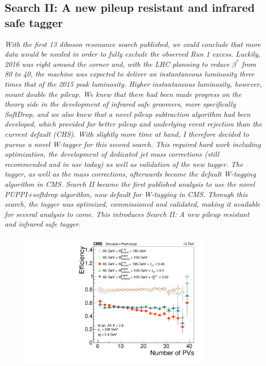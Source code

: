 \vspace*{\fill}
\begin{centering}
\section{Search II: A new pileup resistant and infrared safe tagger}
\label{searchII}
\textit{
With the first 13 \TeV diboson resonance search published, we could conclude that more data would be needed in order to fully exclude the observed Run 1 excess. Luckily, 2016 was right around the corner and, with the LHC planning to reduce $\beta^*$ from 80 \cm to 40, the machine was expected to deliver an instantaneous luminosity three times that of the 2015 peak luminosity. Higher instantaneous luminosity, however, meant double the pileup.
\newline
\newline
We knew that there had been made progress on the theory side in the development of infrared safe groomers, more specifically SoftDrop, and we also knew that a novel pileup subtraction algorithm had been developed, which provided far better pileup and underlying event rejection than the current default (CHS). With slightly more time at hand, I therefore decided to pursue a novel W-tagger for this second search. This required hard work including optimization, the development of dedicated jet mass corrections (still recommended and in use today) as well as validation of the new tagger. The tagger, as well as the mass corrections, afterwards became the default W-tagging algorithm in CMS.
\newline
\newline
Search II became the first published analysis to use the novel PUPPI+softdrop algorithm, now default for W-tagging in CMS. Through this search, the tagger was optimized, commissioned and validated, making it available for several analysis to come. This introduces Search II: A new pileup resistant and infrared safe tagger.
}
\end{centering}
\begin{figure}[b!]
    \centering
    \includegraphics[height=6.5cm]{figures/vtagging/JME-16-003/BoostedW/WtagSigEffvsNPV.pdf}
\end{figure}


